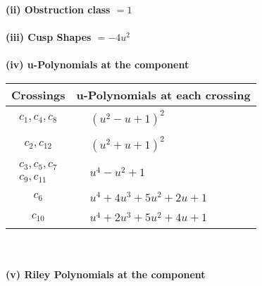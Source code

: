 \documentclass[1p]{elsarticle_modified}
\theoremstyle{definition}
\begin{document}
\flushleft \textbf{(ii) Obstruction class $= 1$}\\~\\
\flushleft \textbf{(iii) Cusp Shapes $= -4 u^2$}\\~\\
\newpage\renewcommand{\arraystretch}{1}
\flushleft \textbf{(iv) u-Polynomials at the component}\newline \\
\begin{tabular}{m{50pt}|m{274pt}}
Crossings & \hspace{64pt}u-Polynomials at each crossing \\
\hline $$\begin{aligned}c_{1},c_{4},c_{8}\end{aligned}$$&$\begin{aligned}
&(u^2- u+1)^2
\end{aligned}$\\
\hline $$\begin{aligned}c_{2},c_{12}\end{aligned}$$&$\begin{aligned}
&(u^2+u+1)^2
\end{aligned}$\\
\hline $$\begin{aligned}c_{3},c_{5},c_{7}\\c_{9},c_{11}\end{aligned}$$&$\begin{aligned}
&u^4- u^2+1
\end{aligned}$\\
\hline $$\begin{aligned}c_{6}\end{aligned}$$&$\begin{aligned}
&u^4+4 u^3+5 u^2+2 u+1
\end{aligned}$\\
\hline $$\begin{aligned}c_{10}\end{aligned}$$&$\begin{aligned}
&u^4+2 u^3+5 u^2+4 u+1
\end{aligned}$\\
\hline
\end{tabular}\\~\\
\newpage\renewcommand{\arraystretch}{1}
\flushleft \textbf{(v) Riley Polynomials at the component}\newline \\
\end{document}
